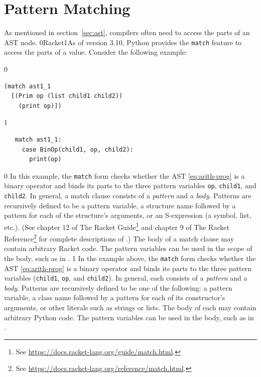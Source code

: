\documentclass[7x10]{TimesAPriori_MIT}%
\def\racketEd{0}
\def\pythonEd{1}
\def\edition{1}
\newcommand{\racket}[1]{{\if\edition\racketEd{#1}\fi}}
\newcommand{\pythonColor}[0]{}
\newcommand{\python}[1]{{\if\edition\pythonEd\pythonColor #1\fi}}
\numberwithin{theorem}{chapter}
\numberwithin{definition}{chapter}
\numberwithin{equation}{chapter}
\begin{document}
\section{Pattern Matching}
\label{sec:pattern-matching}

As mentioned in section~\ref{sec:ast}, compilers often need to access
the parts of an AST node. \racket{Racket}\python{As of version 3.10, Python}
provides the \texttt{match} feature to access the parts of a value.
Consider the following example:  
\begin{center}
\begin{minipage}{1.0\textwidth}
{\if\edition\racketEd
\begin{lstlisting}
(match ast1_1
  [(Prim op (list child1 child2))
    (print op)])
\end{lstlisting}
\fi}
{\if\edition\pythonEd\pythonColor
\begin{lstlisting}
   match ast1_1:
     case BinOp(child1, op, child2):
       print(op)
\end{lstlisting}
\fi}  
\end{minipage}
\end{center}

{\if\edition\racketEd
%
In this example, the \texttt{match} form checks whether the AST
\eqref{eq:arith-prog} is a binary operator and binds its parts to the
three pattern variables \texttt{op}, \texttt{child1}, and
\texttt{child2}. In general, a match clause consists of a
\emph{pattern} and a \emph{body}. Patterns are
recursively defined to be a pattern variable, a structure name
followed by a pattern for each of the structure's arguments, or an
S-expression (a symbol, list, etc.).  (See chapter 12 of The Racket
Guide\footnote{See \url{https://docs.racket-lang.org/guide/match.html}.}
and chapter 9 of The Racket
Reference\footnote{See \url{https://docs.racket-lang.org/reference/match.html}.}
for complete descriptions of .)
%
The body of a match clause may contain arbitrary Racket code.  The
pattern variables can be used in the scope of the body, such as
 in .
%
\fi}
%
%
{\if\edition\pythonEd\pythonColor
%  
In the example above, the \texttt{match} form checks whether the AST
\eqref{eq:arith-prog} is a binary operator and binds its parts to the
three pattern variables (\texttt{child1}, \texttt{op}, and
\texttt{child2}). In general, each  consists of a
\emph{pattern} and a \emph{body}. Patterns are
recursively defined to be one of the following: a pattern variable, a
class name followed by a pattern for each of its constructor's
arguments, or other literals such as strings
or lists.
%
The body of each  may contain arbitrary Python code. The
pattern variables can be used in the body, such as  in
.
%
\fi}
\end{document}
